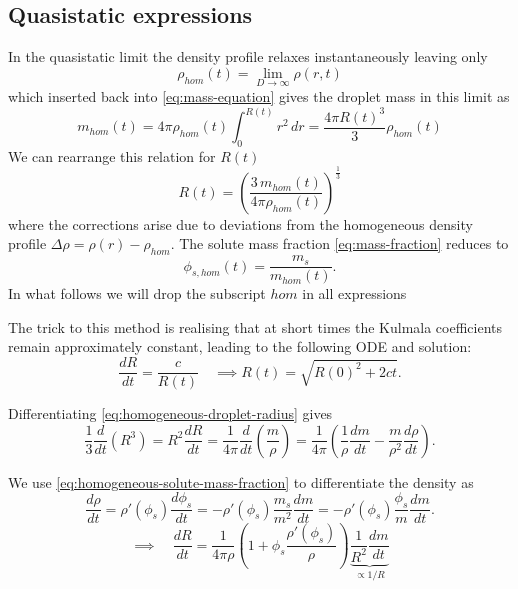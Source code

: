 \documentclass[12pt]{report}
\begin{document}
\subsection{Quasistatic expressions}

In the quasistatic limit the density profile relaxes instantaneously leaving only
\begin{equation}
  \rho_{hom}(t) = \lim_{D\to\infty}{\rho(r,t)}
\end{equation}
which inserted back into \eqref{eq:mass-equation} gives the droplet mass in this limit as
\begin{equation}
  m_{hom}(t) = 4\pi \rho_{hom}(t) \int_0^{R(t)} r^2 \, dr = \frac{4\pi R(t)^3}{3} \rho_{hom}(t)
\end{equation}
We can rearrange this relation for $R(t)$
\begin{equation}\label{eq:homogeneous-droplet-radius}
  R(t) = \left( \frac{3 \, m_{hom}(t)}{4\pi \rho_{hom}(t)} \right)^\frac{1}{3}
\end{equation}
where the corrections arise due to deviations from the homogeneous density profile $\Delta \rho = \rho(r) - \rho_{hom}$.
The solute mass fraction \eqref{eq:mass-fraction} reduces to
\begin{equation}\label{eq:homogeneous-solute-mass-fraction}
  \phi_{s,hom}(t) = \frac{m_s}{m_{hom}(t)}.
\end{equation}
In what follows we will drop the subscript $hom$ in all expressions

The trick to this method is realising that at short times the Kulmala coefficients remain approximately constant, leading to the following ODE and solution:
\begin{equation*}
  \frac{dR}{dt} = \frac{c}{R(t)} \quad \implies R(t) = \sqrt{R(0)^2 + 2ct}.
\end{equation*}

Differentiating \eqref{eq:homogeneous-droplet-radius} gives
\begin{equation}
  \frac{1}{3} \frac{d}{dt} \left( R^3 \right)
  = R^2 \frac{dR}{dt}
  = \frac{1}{4\pi} \frac{d}{dt} \left( \frac{m}{\rho} \right)
  = \frac{1}{4\pi} \left(
  \frac{1}{\rho} \frac{d m}{dt}
  - \frac{m}{\rho^2} \frac{d \rho}{dt}
  \right).
\end{equation}

We use \eqref{eq:homogeneous-solute-mass-fraction} to differentiate the density as
\begin{equation*}
  \frac{d\rho}{dt}
  = \rho'(\phi_s) \frac{d\phi_s}{dt}
  = -\rho'(\phi_s) \frac{m_s}{m^2} \frac{dm}{dt}
  = -\rho'(\phi_s) \frac{\phi_s}{m} \frac{dm}{dt}.
\end{equation*}
\begin{equation}
  \implies \quad \frac{dR}{dt}
  = \frac{1}{4\pi \rho} \left(
  1 + \phi_s \frac{\rho'(\phi_s)}{\rho}
  \right)
  \underbrace{\frac{1}{R^2} \frac{dm}{dt}}_{\propto 1/R}
\end{equation}
\end{document}
